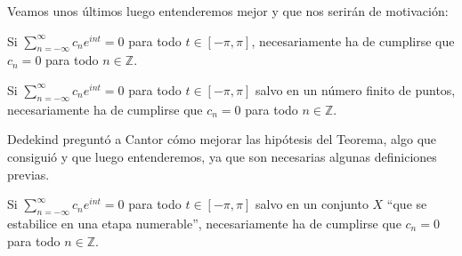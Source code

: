 
Veamos unos últimos luego entenderemos mejor y que nos serirán de motivación:
\begin{teo}
    Si $\sum\limits_{n=-\infty}^{\infty}c_n e^{int} = 0$ para todo $t\in [-\pi, \pi]$, necesariamente ha de cumplirse que $c_n = 0$ para todo $n\in \mathbb{Z}$.
\end{teo}

\begin{teo}[Dedekind]
    Si $\sum\limits_{n=-\infty}^{\infty}c_n e^{int} = 0$ para todo $t\in [-\pi, \pi]$ salvo en un número finito de puntos, necesariamente ha de cumplirse que $c_n = 0$ para todo $n\in \mathbb{Z}$.
\end{teo}

Dedekind preguntó a Cantor cómo mejorar las hipótesis del Teorema, algo que consiguió y que luego entenderemos, ya que son necesarias algunas definiciones previas.

\begin{teo}
    Si $\sum\limits_{n=-\infty}^{\infty}c_n e^{int} = 0$ para todo $t\in [-\pi, \pi]$ salvo en un conjunto $X$ ``que se estabilice en una etapa numerable'', necesariamente ha de cumplirse que $c_n = 0$ para todo $n\in \mathbb{Z}$.
\end{teo}

